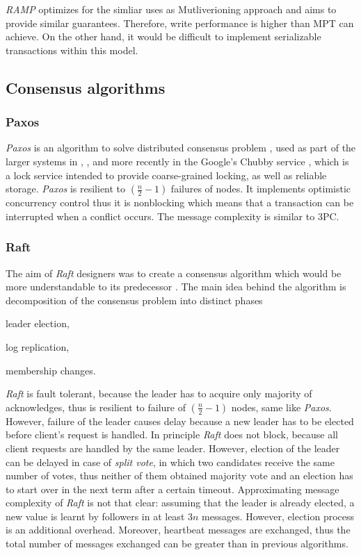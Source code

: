 \documentclass[runningheads,a4paper]{llncs}
\newcommand{\paxos}{\emph{Paxos}\xspace}
\begin{document}
\emph{RAMP} optimizes for the simliar uses as Mutliverioning approach and aims to provide similar guarantees. Therefore, write performance is higher than MPT can achieve. On the other hand, it would be difficult to implement serializable transactions within this model. 

\subsection{Consensus algorithms}

\subsubsection{Paxos}

\paxos is an algorithm to solve distributed consensus problem \cite{Lamport1998partTimeParliment} \cite{lamport2001paxosMadeSimple}, used as part of the larger systems in \cite{chandra2007PaxosMadeLive}, \cite{lampson1996build}, and more recently in the Google's Chubby service \cite{burrows2006chubby}, which is a lock service intended to provide coarse-grained locking, as well as reliable storage. \paxos is resilient to $(\frac{n}{2}-1)$ failures of nodes. It implements optimistic concurrency control thus it is nonblocking which means that a transaction can be interrupted when a conflict occurs. The message complexity is similar to 3PC.

\subsubsection{Raft}

The aim of \emph{Raft} designers was to create a consensus algorithm which would be more understandable to its predecessor \cite{ongaro2014search}. The main idea behind the algorithm is decomposition of the consensus problem into distinct phases \begin{enumerate*}[label=\alph*)]
  \item leader election,
  \item log replication,
  \item membership changes.
\end{enumerate*} 
\emph{Raft} is fault tolerant, because the leader has to acquire only majority of acknowledges, thus is resilient to failure of $(\frac{n}{2}-1)$ nodes, same like \paxos. However, failure of the leader causes delay because a new leader has to be elected before client's request is handled. In principle \emph{Raft} does not block, because all client requests are handled by the same leader. However, election of the leader can be delayed in case of \emph{split vote}, in which two candidates receive the same number of votes, thus neither of them obtained majority vote and an election has to start over in the next term after a certain timeout. Approximating message complexity of \emph{Raft} is not that clear: assuming that the leader is already elected, a new value is learnt by followers in at least $3n$ messages. However, election process is an additional overhead. Moreover, heartbeat messages are exchanged, thus the total number of messages exchanged can be greater than in previous algorithms.
\end{document}
